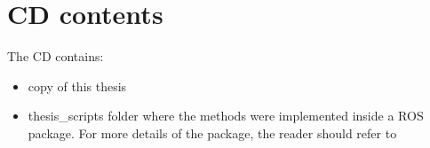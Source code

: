 \appendix
\chapter*{CD contents}
\label{chap:cd}
The CD contains:
\begin{itemize}
\item  copy of this thesis 
\item  thesis\_scripts folder where the methods were implemented inside a ROS package. For more details of the package, the reader should refer to \cite{cesitar}

\end{itemize}





